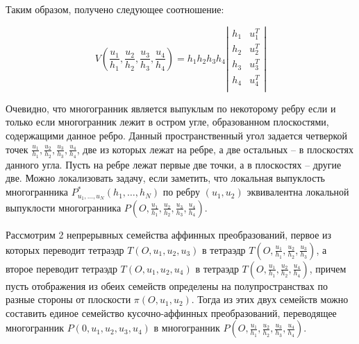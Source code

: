 \documentclass[a4paper, 12pt, titlepage]{article}
\theoremstyle{definition}
\theoremstyle{plain}
\theoremstyle{plain}
\begin{document}
Таким образом, получено следующее соотношение:

\begin{equation}
\label{eq:volume-equals-support-criterion}
V \left(\frac{u_{1}}{h_{1}},
\frac{u_{2}}{h_{2}},  \frac{u_{3}}{h_{3}}, \frac{u_{4}}{h_{4}}\right) =
h_{1} h_{2} h_{3} h_{4}
\left|
\begin{array}{cc}
  h_{1} & u_{1}^{T} \\
  h_{2} & u_{2}^{T} \\
  h_{3} & u_{3}^{T} \\
  h_{4} & u_{4}^{T} \\
\end{array}
\right|
\end{equation}

Очевидно, что многогранник является выпуклым по некоторому ребру если и только
если многогранник лежит в остром угле, образованном плоскостями, содержащими
данное ребро. Данный пространственный угол задается четверкой точек
$\frac{u_{1}}{h_{1}}, \frac{u_{2}}{h_{2}},  \frac{u_{3}}{h_{3}},
\frac{u_{4}}{h_{4}}$, две из которых лежат на ребре, а две остальных -- в
плоскостях данного угла. Пусть на ребре лежат первые две точки, а в
плоскостях -- другие две. Можно локализовать задачу, если заметить, что
локальная выпуклость многогранника $P^{*}_{u_{1}, \ldots, u_{N}}(h_{1}, \ldots,
h_{N})$ по ребру $(u_{1}, u_{2})$ эквивалентна локальной выпуклости
многогранника $P\left(O, \frac{u_{1}}{h_{1}}, \frac{u_{2}}{h_{2}},
\frac{u_{3}}{h_{3}}, \frac{u_{4}}{h_{4}}\right)$.

Рассмотрим 2 непрерывных семейства аффинных
преобразований, первое из которых переводит тетраэдр $T(O, u_{1}, u_{2},
u_{3})$ в тетраэдр $T\left(O, \frac{u_{1}}{h_{1}}, \frac{u_{2}}{h_{2}},
\frac{u_{3}}{h_{3}}\right)$, а второе переводит тетраэдр $T(O, u_{1}, u_{2},
u_{4})$ в тетраэдр $T\left(O, \frac{u_{1}}{h_{1}}, \frac{u_{2}}{h_{2}},
\frac{u_{4}}{h_{4}}\right)$, причем пусть отображения из обеих
семейств определены на полупространствах по разные стороны от плоскости
$\pi(O, u_{1}, u_{2})$. Тогда из этих двух семейств можно составить единое
семейство кусочно-аффинных преобразований, переводящее многогранник
$P(0, u_{1}, u_{2}, u_{3}, u_{4})$ в многогранник
$P\left(O, \frac{u_{1}}{h_{1}}, \frac{u_{2}}{h_{2}}, \frac{u_{3}}{h_{3}},
\frac{u_{4}}{h_{4}}\right)$.
\end{document}
